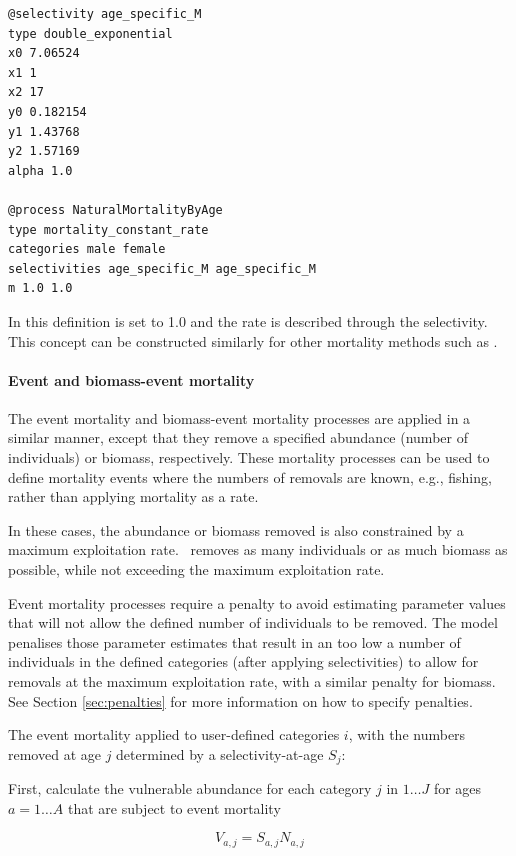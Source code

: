 {\small{\begin{verbatim}
@selectivity age_specific_M
type double_exponential
x0 7.06524
x1 1
x2 17
y0 0.182154
y1 1.43768
y2 1.57169
alpha 1.0

@process NaturalMortalityByAge
type mortality_constant_rate
categories male female
selectivities age_specific_M age_specific_M
m 1.0 1.0
\end{verbatim}}}

In this definition  is set to 1.0 and the rate is described through the selectivity. This concept can be constructed similarly for other mortality methods such as .

\paragraph{Event and biomass-event mortality}

The event mortality and biomass-event mortality processes are applied in a similar manner, except that they remove a specified abundance (number of individuals) or biomass, respectively. These mortality processes can be used to define mortality events where the numbers of removals are known, e.g., fishing, rather than applying mortality as a rate.

In these cases, the abundance or biomass removed is also constrained by a maximum exploitation rate. \CNAME\ removes as many individuals or as much biomass as possible,  while not exceeding the maximum exploitation rate.

Event mortality processes require a penalty to avoid estimating parameter values that will not allow the defined number of individuals to be removed. The model penalises those parameter estimates that result in an too low a number of individuals in the defined categories (after applying selectivities) to allow for removals at the maximum exploitation rate, with a similar penalty for biomass. See Section \ref{sec:penalties} for more information on how to specify penalties.

The event mortality applied to user-defined categories $i$, with the numbers removed at age $j$ determined by a selectivity-at-age $S_j$:

First, calculate the vulnerable abundance for each category $j$ in $1 \ldots J$ for ages $a = 1 \ldots A$ that are subject to event mortality

\begin{equation}
  V_{a,j} = S_{a,j} N_{a,j}
\end{equation}

